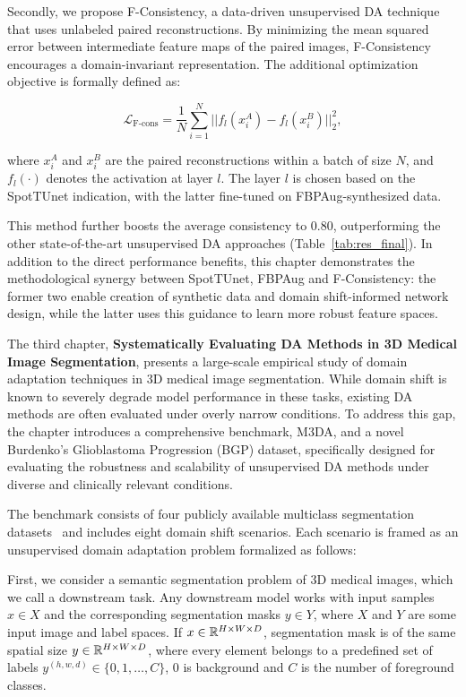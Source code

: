 Secondly, we propose F-Consistency, a data-driven unsupervised DA technique that uses unlabeled paired reconstructions. By minimizing the mean squared error between intermediate feature maps of the paired images, F-Consistency encourages a domain-invariant representation. The additional optimization objective is formally defined as:

\begin{equation}
	\mathcal{L}_{\text{F-cons}} = \frac{1}{N} \sum_{i=1}^{N} || f_l \left( x_i^A \right) - f_l \left( x_i^B \right) ||_2^2,
\end{equation}

\noindent
where $x_i^A$ and $x_i^B$ are the paired reconstructions within a batch of size $N$, and $f_l \left( \cdot \right)$ denotes the activation at layer $l$. The layer $l$ is chosen based on the SpotTUnet indication, with the latter fine-tuned on FBPAug-synthesized data.

This method further boosts the average consistency to 0.80, outperforming the other state-of-the-art unsupervised DA approaches (Table~\ref{tab:res_final}). In addition to the direct performance benefits, this chapter demonstrates the methodological synergy between SpotTUnet, FBPAug and F-Consistency: the former two enable creation of synthetic data and domain shift-informed network design, while the latter uses this guidance to learn more robust feature spaces.




The third chapter, \textbf{Systematically Evaluating DA Methods in 3D Medical Image Segmentation}, presents a large-scale empirical study of domain adaptation techniques in 3D medical image segmentation. While domain shift is known to severely degrade model performance in these tasks, existing DA methods are often evaluated under overly narrow conditions. To address this gap, the chapter introduces a comprehensive benchmark, M3DA, and a novel Burdenko’s Glioblastoma Progression (BGP) dataset, specifically designed for evaluating the robustness and scalability of unsupervised DA methods under diverse and clinically relevant conditions.

The benchmark consists of four publicly available multiclass segmentation datasets~\cite{amos,brats,cc359,lidc} and includes eight domain shift scenarios. Each scenario is framed as an unsupervised domain adaptation problem formalized as follows:

First, we consider a semantic segmentation problem of 3D medical images, which we call a downstream task. Any downstream model works with input samples $x \in X$ and the corresponding segmentation masks $y \in Y$, where $X$ and $Y$ are some input image and label spaces. If $x \in \mathbb{R}^{H \times W \times D}$, segmentation mask is of the same spatial size $y \in \mathbb{R}^{H \times W \times D}$, where every element belongs to a predefined set of labels $y^{(h,w,d)} \in \{ 0, 1, \dots, C \}$, $0$ is background and $C$ is the number of foreground classes.

